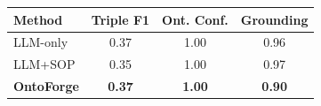\begin{tabular}{lccc}
\toprule
Method & Triple F1 & Ont. Conf. & Grounding \\
\midrule
LLM-only & 0.37 & 1.00 & 0.96 \\
LLM+SOP & 0.35 & 1.00 & 0.97 \\
\midrule
\textbf{OntoForge} & \textbf{0.37} & \textbf{1.00} & \textbf{0.90} \\
\bottomrule
\end{tabular}
